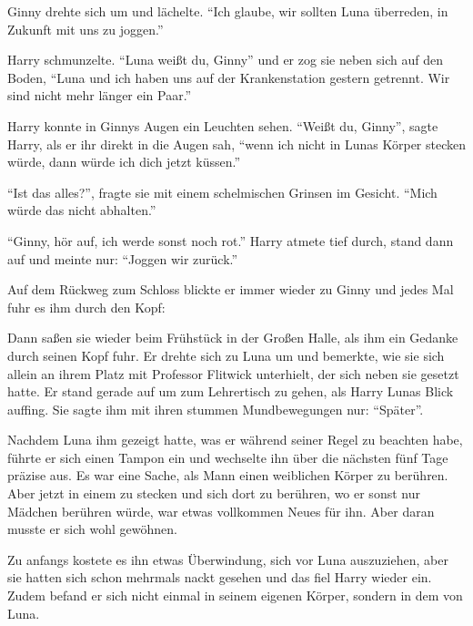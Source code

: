 Ginny drehte sich um und lächelte. \enquote{Ich glaube, wir sollten Luna überreden, in Zukunft mit uns zu joggen.}

Harry schmunzelte. \enquote{Luna \gst weißt du, Ginny} und er zog sie neben sich auf den Boden, \enquote{Luna und ich haben uns auf der Krankenstation gestern getrennt. Wir sind nicht mehr länger ein Paar.}

Harry konnte in Ginnys Augen ein Leuchten sehen. \enquote{Weißt du, Ginny}, sagte Harry, als er ihr direkt in die Augen sah, \enquote{wenn ich nicht in Lunas Körper stecken würde, dann würde ich dich jetzt küssen.}

\enquote{Ist das alles?}, fragte sie mit einem schelmischen Grinsen im Gesicht. \enquote{Mich würde das nicht abhalten.}

\enquote{Ginny, hör auf, ich werde sonst noch rot.} Harry atmete tief durch, stand dann auf und meinte nur: \enquote{Joggen wir zurück.}

Auf dem Rückweg zum Schloss blickte er immer wieder zu Ginny und jedes Mal fuhr es ihm durch den Kopf: 

Dann saßen sie wieder beim Frühstück in der Großen Halle, als ihm ein Gedanke durch seinen Kopf fuhr.  Er drehte sich zu Luna um und bemerkte, wie sie sich \gst allein an ihrem Platz \gst mit Professor Flitwick unterhielt, der sich neben sie gesetzt hatte. Er stand gerade auf um zum Lehrertisch zu gehen, als Harry Lunas Blick auffing. Sie sagte ihm mit ihren stummen Mundbewegungen nur: \enquote{Später}.

Nachdem Luna ihm gezeigt hatte, was er während seiner Regel zu beachten habe, führte er sich einen Tampon ein und wechselte ihn über die nächsten fünf Tage präzise aus. Es war eine Sache, als Mann einen weiblichen Körper zu berühren. Aber jetzt in einem zu stecken und sich dort zu berühren, wo er sonst nur Mädchen berühren würde, war etwas vollkommen Neues für ihn. Aber daran musste er sich wohl gewöhnen.

Zu anfangs kostete es ihn etwas Überwindung, sich vor Luna auszuziehen, aber sie hatten sich schon mehrmals nackt gesehen und das fiel Harry wieder ein. Zudem befand er sich nicht einmal in seinem eigenen Körper, sondern in dem von Luna.

